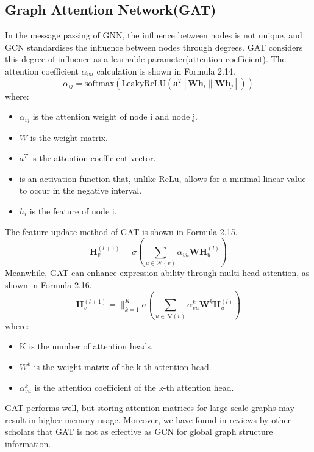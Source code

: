 \documentclass[ %
                    author={Tengyao Tu},
                supervisor={Dr. James Pope},
                    degree={MSc},
                     title={A New Perspective on Graph Community Detection: Combining Traditional Methods with Deep Learning Approaches},
                  subtitle={Applying to Telecom Networks and Diverse Datasets},
                      type={},
                      year={2024}]{dissertation}
\begin{document}
\subsection{Graph Attention Network(GAT)}
In the message passing of GNN, the influence between nodes is not unique, and GCN standardises the influence between nodes through degrees. GAT considers this degree of influence as a learnable parameter(attention coefficient). The attention coefficient $\alpha_{vu}$ calculation is shown in Formula 2.14.
\begin{equation}
\alpha_{ij} = \text{softmax}\left( \text{LeakyReLU}\left( \mathbf{a}^T \left[ \mathbf{W} \mathbf{h}_i \| \mathbf{W} \mathbf{h}_j \right] \right) \right)
\label{eq: GAT}
\end{equation}
where:
\begin{itemize}
    \item $\alpha_{ij}$ is the attention weight of node i and node j.
    \item  $W$ is the weight matrix.
    \item  ${a}^T$ is the attention coefficient vector.
    \item  {} is an activation function that, unlike ReLu, allows for a minimal linear value to occur in the negative interval.
    \item ${h}_i$ is the feature of node i.
\end{itemize}
The feature update method of GAT is shown in Formula 2.15.
\begin{equation}
\mathbf{H}_v^{(l+1)} = \sigma \left( \sum_{u \in \mathcal{N}(v)} \alpha_{vu} \mathbf{W} \mathbf{H}_u^{(l)} \right)
\label{eq: GAT2}
\end{equation}
Meanwhile, GAT can enhance expression ability through multi-head attention, as shown in Formula 2.16.
\begin{equation}
\mathbf{H}_v^{(l+1)} = \|_{k=1}^K \sigma \left( \sum_{u \in \mathcal{N}(v)} \alpha_{vu}^k \mathbf{W}^k \mathbf{H}_u^{(l)} \right)
\label{eq: GAT3}
\end{equation}
where:
\begin{itemize}
    \item K is the number of attention heads.
    \item ${W}^k$ is the weight matrix of the k-th attention head.
    \item $\alpha_{vu}^k$ is the attention coefficient of the k-th attention head.
\end{itemize}
GAT performs well, but storing attention matrices for large-scale graphs may result in higher memory usage. Moreover, we have found in reviews by other scholars that GAT is not as effective as GCN for global graph structure information.
\end{document}

